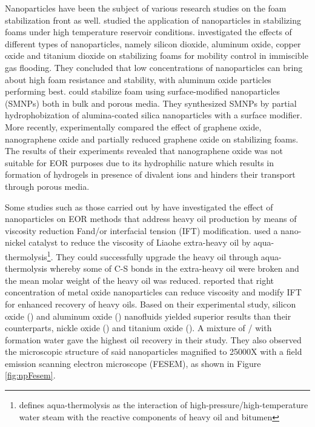 Nanoparticles have been the subject of various research studies on the foam stabilization front as well. \citet{Zhang2009} studied the application of nanoparticles in stabilizing foams under high temperature reservoir conditions. \citet{Manan2015} investigated the effects of different types of nanoparticles, namely silicon dioxide, aluminum oxide, copper oxide and titanium dioxide on stabilizing  foams for mobility control in immiscible gas flooding. They concluded that low concentrations of nanoparticles can bring about high foam resistance and stability, with aluminum oxide particles performing best. \citet{Singh2016} could stabilize foam using surface-modified nanoparticles (SMNPs) both in bulk and porous media. They synthesized SMNPs by partial hydrophobization of alumina-coated silica nanoparticles with a surface modifier. More recently, \citet{Barrabino2018} experimentally compared the effect of graphene oxide, nanographene oxide and partially reduced graphene oxide on stabilizing  foams. The results of their experiments revealed that nanographene oxide was not suitable for  EOR purposes due to its hydrophilic nature which results in formation of hydrogels in presence of divalent ions and hinders their transport through porous media.

Some studies such as those carried out by \citet{HamediShokrlu2010, HamediShokrlu2013} have investigated the effect of nanoparticles on EOR methods that address heavy oil production by means of viscosity reduction Fand/or interfacial tension  (IFT) modification. \citet{LI2007} used a nano-nickel catalyst to reduce the viscosity of Liaohe extra-heavy oil by aqua-thermolysis\footnote{\citet{Hyne1986} defines aqua-thermolysis as the interaction of high-pressure/high-temperature water steam with the reactive components of heavy oil and bitumen}. They could successfully upgrade the heavy oil through aqua-thermolysis whereby some of C-S bonds in the extra-heavy oil were broken and the mean molar weight of the heavy oil was reduced. \citet{Alomair2015} reported that right concentration of metal oxide nanoparticles can reduce viscosity and modify IFT for enhanced recovery of heavy oils. Based on their experimental study, silicon oxide () and aluminum oxide () nanofluids yielded superior results than their counterparts, nickle oxide () and titanium oxide (). A mixture of / with formation water gave the highest oil recovery in their study. They also observed the microscopic structure of said nanoparticles magnified to 25000X with a field emission scanning electron microscope (FESEM),  as shown in Figure \ref{fig:npFesem}.


